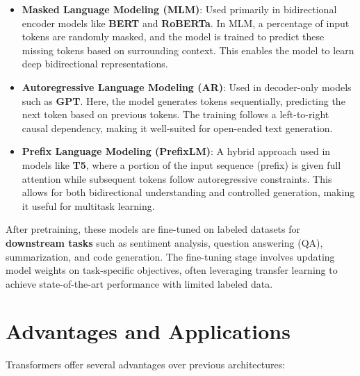 \begin{itemize}
    \item \textbf{Masked Language Modeling (MLM)}: Used primarily in bidirectional encoder models like \textbf{BERT} and \textbf{RoBERTa}. In MLM, a percentage of input tokens are randomly masked, and the model is trained to predict these missing tokens based on surrounding context. This enables the model to learn deep bidirectional representations.

    \item \textbf{Autoregressive Language Modeling (AR)}: Used in decoder-only models such as \textbf{GPT}. Here, the model generates tokens sequentially, predicting the next token based on previous tokens. The training follows a left-to-right causal dependency, making it well-suited for open-ended text generation.

    \item \textbf{Prefix Language Modeling (PrefixLM)}: A hybrid approach used in models like \textbf{T5}, where a portion of the input sequence (prefix) is given full attention while subsequent tokens follow autoregressive constraints. This allows for both bidirectional understanding and controlled generation, making it useful for multitask learning.

\end{itemize}

After pretraining, these models are fine-tuned on labeled datasets for \textbf{downstream tasks} such as sentiment analysis, question answering (QA), summarization, and code generation. The fine-tuning stage involves updating model weights on task-specific objectives, often leveraging transfer learning to achieve state-of-the-art performance with limited labeled data.

\section{Advantages and Applications}

Transformers offer several advantages over previous architectures:

